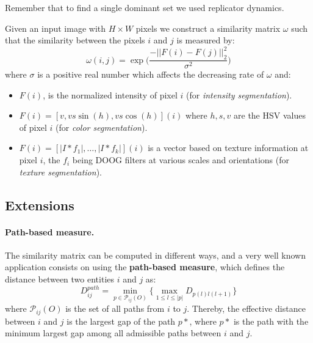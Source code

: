 Remember that to find a single dominant set we used replicator dynamics.

Given an input image with $H \times W$ pixels we construct a similarity matrix $\omega$ such that the similarity between the pixels $i$ and $j$ is measured by:
$$\omega(i,j) = \exp\Big(\frac{-||F(i)- F(j)||^2_2}{\sigma^2}\Big)$$
where $\sigma$ is a positive real number which affects the decreasing rate of $\omega$ and:
\begin{itemize}
	\item $F(i)$, is the normalized intensity of pixel $i$ (for \textit{intensity segmentation}).
	\item $F(i) = [v, vs\sin(h), vs\cos(h)](i)$ where $h,s,v$ are the HSV values of pixel $i$ (for \textit{color segmentation}).
	\item $F(i) = [|I*f_1|, \dots, |I*f_k|](i)$ is a vector based on texture information at pixel $i$, the $f_i$ being DOOG filters at various scales and orientations (for \textit{texture segmentation}).
\end{itemize}

\subsection{Extensions}
\paragraph{Path-based measure.} The similarity matrix can be computed in different ways, and a very well known application consists on using the \textbf{path-based measure}, which defines the distance between two entities $i$ and $j$ as:
$$D_{ij}^{path} = \min\limits_{p\in\mathcal{P}_{ij}(O)}\Big\{\max\limits_{1\leq l \leq |p|}D_{p(l)l(l+1)}\Big\}$$
where $\mathcal{P}_{ij}(O)$ is the set of all paths from $i$ to $j$. Thereby, the effective distance between $i$ and $j$ is the largest gap of the path $p*$, where $p*$ is the path with the minimum largest gap among all admissible paths between $i$ and $j$.

